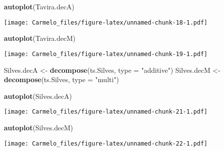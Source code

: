 \documentclass[
  14pt,
]{article}
\newenvironment{Shaded}{\begin{snugshade}}{\end{snugshade}}
\newcommand{\AttributeTok}[1]{\textcolor[rgb]{0.13,0.29,0.53}{#1}}
\newcommand{\FunctionTok}[1]{\textcolor[rgb]{0.13,0.29,0.53}{\textbf{#1}}}
\newcommand{\NormalTok}[1]{#1}
\newcommand{\OtherTok}[1]{\textcolor[rgb]{0.56,0.35,0.01}{#1}}
\newcommand{\StringTok}[1]{\textcolor[rgb]{0.31,0.60,0.02}{#1}}
\begin{document}
\begin{Shaded}
\begin{Highlighting}[]
\FunctionTok{autoplot}\NormalTok{(Tavira.decA)}
\end{Highlighting}
\end{Shaded}

\texttt{[image: Carmelo\_files/figure-latex/unnamed-chunk-18-1.pdf]}

\begin{Shaded}
\begin{Highlighting}[]
\FunctionTok{autoplot}\NormalTok{(Tavira.decM)}
\end{Highlighting}
\end{Shaded}

\texttt{[image: Carmelo\_files/figure-latex/unnamed-chunk-19-1.pdf]}

\begin{Shaded}
\begin{Highlighting}[]
\NormalTok{Silves.decA }\OtherTok{\textless{}{-}} \FunctionTok{decompose}\NormalTok{(ts.Silves, }\AttributeTok{type =} \StringTok{"additive"}\NormalTok{)}
\NormalTok{Silves.decM }\OtherTok{\textless{}{-}} \FunctionTok{decompose}\NormalTok{(ts.Silves, }\AttributeTok{type =} \StringTok{"multi"}\NormalTok{)}
\end{Highlighting}
\end{Shaded}

\begin{Shaded}
\begin{Highlighting}[]
\FunctionTok{autoplot}\NormalTok{(Silves.decA)}
\end{Highlighting}
\end{Shaded}

\texttt{[image: Carmelo\_files/figure-latex/unnamed-chunk-21-1.pdf]}

\begin{Shaded}
\begin{Highlighting}[]
\FunctionTok{autoplot}\NormalTok{(Silves.decM)}
\end{Highlighting}
\end{Shaded}

\texttt{[image: Carmelo\_files/figure-latex/unnamed-chunk-22-1.pdf]}
\end{document}
